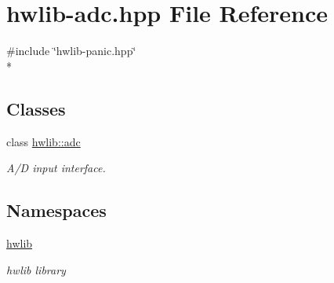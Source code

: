 \hypertarget{hwlib-adc_8hpp}{}\section{hwlib-\/adc.hpp File Reference}
\label{hwlib-adc_8hpp}
{\ttfamily \#include \char`\"{}hwlib-\/panic.\+hpp\char`\"{}}\\*
\subsection*{Classes}
\begin{DoxyCompactItemize}
\item 
class \hyperlink{classhwlib_1_1adc}{hwlib\+::adc}
\begin{DoxyCompactList}\small\item\em A/D input interface. \end{DoxyCompactList}\end{DoxyCompactItemize}
\subsection*{Namespaces}
\begin{DoxyCompactItemize}
\item 
 \hyperlink{namespacehwlib}{hwlib}
\begin{DoxyCompactList}\small\item\em hwlib library \end{DoxyCompactList}\end{DoxyCompactItemize}

